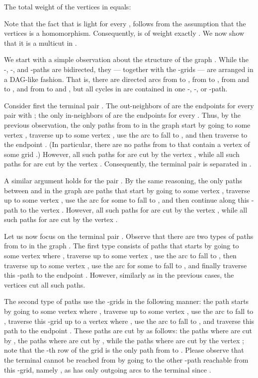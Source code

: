 The total weight of the vertices in  equals:

Note that the fact that 
 is light for every , 
follows from the assumption that the vertices  
is a homomorphism.
Consequently,  is of weight exactly . We now show that it is a multicut in .

We start with a simple observation about the structure of the graph . While
the -, -, and -paths are bidirected, they --- together with the -grids --- are arranged in a DAG-like fashion.
That is, there are directed arcs from  to , from  to , from  and  to , and from  to  and ,
but all cycles in  are contained in one -, -, or -path. 
 
Consider first the terminal pair . The out-neighbors of  are the endpoints  for every pair  with ;
the only in-neighbors of  are the endpoints  for every .
Thus, by the previous observation, the only paths from  to  in the graph  start by going to some vertex , traverse  up to some vertex , use the arc 
to fall to , and then traverse  to the endpoint . 
(In particular, there are no paths from  to  that contain a vertex of some grid .)
However, all such paths for  are cut
by the vertex , while all such paths for  are cut by the vertex . Consequently,
the terminal pair  is separated in .

A similar argument holds for the pair . By the same reasoning, the only paths between  and  in the graph 
are paths that start by going to some vertex , traverse  up to some vertex , use the arc
 for some  to fall to , and then continue along this -path to the vertex .
However, all such paths for  are cut by the vertex , while all such paths for  are cut by the vertex .

Let us now focus on the terminal pair . Observe that there are two types of paths from  to  in the graph .
The first type consists of paths that starts by going to some vertex  where , traverse  up to some vertex ,
use the arc  to fall to , then traverse  up to some vertex , use
the arc  for some  to fall to , and finally traverse this -path to the endpoint .
However, similarly as in the previous cases, the vertices  cut all such paths.

The second type of paths use the -grids in the following manner: the path starts by going to some vertex  where ,
traverse  up to some vertex , use the arc  to fall to ,
traverse this -grid up to a vertex  where , use the arc  to fall to ,
and traverse this path to the endpoint . These paths are cut by  as follows: the paths where  are cut by ,
the paths where  are cut by , while the paths where  are cut by the vertex ;
note that the -th row of the grid is the only path from  to .
Please observe that the terminal  cannot be reached from  by going to the other -path reachable from this -grid,
namely , as  has only outgoing arcs to the terminal  since .

